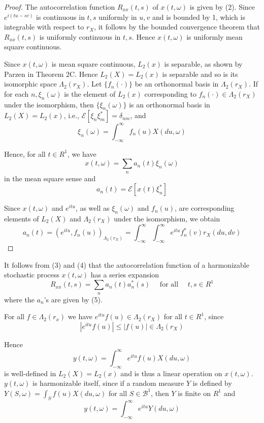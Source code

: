 \documentclass{article}
\begin{document}
\begin{proof}
The autocorrelation function $R_{x x}(t, s)$ of $x(t, \omega)$ is given by (2). Since $e^{i(t u-s v)}$ is continuous in $t, s$ uniformly in $u, v$ and is bounded by 1, which is integrable with respect to $r_{X}$, it follows by the bounded convergence theorem that $R_{x x}(t, s)$ is uniformly continuous in $t, s$. Hence $x(t, \omega)$ is uniformly mean square continuous.

Since $x(t, \omega)$ is mean square continuous, $L_{2}(x)$ is separable, as shown by Parzen \cite{parzen1967} in Theorem 2C. Hence $L_{2}(X)=L_{2}(x)$ is separable and so is its isomorphic space $\Lambda_{2}(r_{X})$. Let $\{f_{n}(\cdot)\}$ be an orthonormal basis in $\Lambda_{2}(r_{X})$. If for each $n, \xi_{n}(\omega)$ is the element of $L_{2}(x)$ corresponding to $f_{n}(\cdot) \in \Lambda_{2}(r_{X})$ under the isomorphism, then $\{\xi_{n}(\omega)\}$ is an orthonormal basis in $L_{2}(X)=L_{2}(x)$, i.e., $\mathscr{E}[\xi_{n} \xi_{m}^{*}]=\delta_{n m}$, and
\[
\xi_{n}(\omega)=\int_{-\infty}^{\infty} f_{n}(u) X(d u, \omega)
\]

Hence, for all $t \in R^{1}$, we have
\[
x(t, \omega)=\sum_{n} a_{n}(t) \xi_{n}(\omega)
\]
in the mean square sense and
\[
a_{n}(t)=\mathscr{E}[x(t) \xi_{n}^{*}]
\]

Since $x(t, \omega)$ and $e^{i t u}$, as well as $\xi_{n}(\omega)$ and $f_{n}(u)$, are corresponding elements of $L_{2}(X)$ and $\Lambda_{2}(r_{X})$ under the isomorphism, we obtain
\[
a_{n}(t)=(e^{i t u}, f_{n}(u))_{\Lambda_{2}(r_{X})}=\int_{-\infty}^{\infty} \int_{-\infty}^{\infty} e^{i t u} f_{n}^{*}(v) r_{X}(d u, d v)
\]
\end{proof}

It follows from (3) and (4) that the autocorrelation function of a harmonizable stochastic process $x(t, \omega)$ has a series expansion
\[
R_{x x}(t, s)=\sum_{n} a_{n}(t) a_{n}^{*}(s) \quad \text { for all } \quad t, s \in R^{1}
\]
where the $a_{n}$'s are given by (5).

For all $f \in \Lambda_{2}(r_{x})$ we have $e^{i t u} f(u) \in \Lambda_{2}(r_{X})$ for all $t \in R^{1}$, since
\[
|e^{i t u} f(u)| \leqslant |f(u)| \in \Lambda_{2}(r_{X})
\]

Hence
\[
y(t, \omega)=\int_{-\infty}^{\infty} e^{i t u} f(u) X(d u, \omega)
\]
is well-defined in $L_{2}(X)=L_{2}(x)$ and is thus a linear operation on $x(t, \omega)$. $y(t, \omega)$ is harmonizable itself, since if a random measure $Y$ is defined by $Y(S, \omega)=\int_{S} f(u) X(d u, \omega)$ for all $S \in \mathscr{B}^{1}$, then $Y$ is finite on $R^{1}$ and
\[
y(t, \omega)=\int_{-\infty}^{\infty} e^{i t u} Y(d u, \omega)
\]
\end{document}
